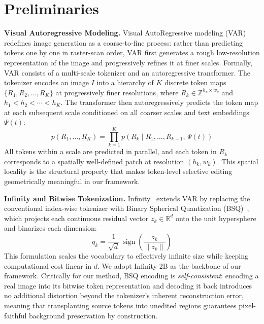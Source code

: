 \section{Preliminaries}
\label{sec:preliminaries}

\noindent\textbf{Visual Autoregressive Modeling.}
Visual AutoRegressive modeling (VAR)~\cite{VAR} redefines image generation as a
coarse-to-fine process: rather than predicting tokens one by one in raster-scan
order, VAR first generates a rough low-resolution representation of the image and
progressively refines it at finer scales. Formally, VAR consists of a multi-scale tokenizer and
an autoregressive transformer. The tokenizer encodes an image $I$ into a hierarchy
of $K$ discrete token maps $\{R_1, R_2, \ldots, R_K\}$ at progressively finer
resolutions, where $R_k \in \mathbb{Z}^{h_k \times w_k}$ and
$h_1 < h_2 < \cdots < h_K$. The transformer then autoregressively predicts the
token map at each subsequent scale conditioned on all coarser scales and text
embeddings $\Psi(t)$:
\begin{equation}
    p(R_1, \ldots, R_K) = \prod_{k=1}^{K} p\!\left(R_k \mid R_1, \ldots,
    R_{k-1},\, \Psi(t)\right)
\end{equation}
All tokens within a scale are predicted in parallel, and each token in $R_k$
corresponds to a spatially well-defined patch at resolution $(h_k, w_k)$. This
spatial locality is the structural property that makes token-level selective
editing geometrically meaningful in our framework.

\noindent\textbf{Infinity and Bitwise Tokenization.}
Infinity~\cite{Infinity} extends VAR by replacing the conventional index-wise
tokenizer with Binary Spherical Quantization (BSQ)~\cite{BSQVAE}, which projects
each continuous residual vector $z_k \in \mathbb{R}^d$ onto the unit hypersphere
and binarizes each dimension:
\begin{equation}
    q_k = \frac{1}{\sqrt{d}}\,\operatorname{sign}\!\left(\frac{z_k}{\|z_k\|}
    \right)
\end{equation}
This formulation scales the vocabulary to effectively infinite size while keeping
computational cost linear in $d$. We adopt Infinity-2B as the backbone of our
framework. Critically for our method, BSQ encoding is \textit{self-consistent}: encoding
a real image into its bitwise token representation and decoding it back introduces
no additional distortion beyond the tokenizer's inherent reconstruction error, meaning that transplanting source tokens into unedited regions
guarantees pixel-faithful background preservation by construction.

